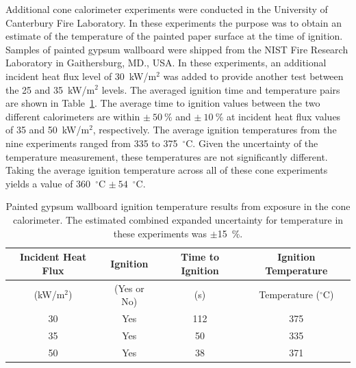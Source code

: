 \documentclass[twoside]{uocthesis}
\begin{document}
{Additional cone calorimeter experiments were conducted in the University of Canterbury Fire Laboratory.  In these experiments the purpose was to obtain an estimate of the temperature of the painted paper surface at the time of ignition.   Samples of painted gypsum wallboard were shipped from the NIST Fire Research Laboratory in Gaithersburg, MD., USA.  In these experiments, an additional incident heat flux level of 30~kW/m$^2$ was added to provide another test between the 25 and 35~kW/m$^2$ levels.  The averaged ignition time and temperature pairs are shown in Table~\ref{tab:Gypsum_wallboard_igntemp}.  The average time to ignition values between the two different calorimeters are within $\pm~50~\%$ and $\pm~10~\%$ at incident heat flux values of 35 and 50~kW/m$^2$, respectively.  The average ignition temperatures from the nine experiments ranged from 335 to 375~$^{\circ}$C.  Given the uncertainty of the temperature measurement, these temperatures are not significantly different.  Taking the average ignition temperature across all of these cone experiments yields a value of 360~$^{\circ}$C $\pm~54$~$^{\circ}$C.  
          
\begin{table}
	\centering
	\begin{tabular}{|c|c|c|c|}
		\hline Incident Heat Flux & Ignition & Time to Ignition & Ignition Temperature \\
		\hline (kW/m$^2$) & (Yes or No) & (s)  & Temperature ($^{\circ}$C)   \\ 
		\hline 30 	& Yes 	& 112	& 375 	 \\
		\hline 35	& Yes 	& 50 	& 335 	 \\
		\hline 50	& Yes 	& 38 	& 371 	 \\
		\hline
	\end{tabular}
	\caption[Painted gypsum wallboard ignition temperature results]{Painted gypsum wallboard ignition temperature results from exposure in the cone calorimeter.  The estimated combined expanded uncertainty for temperature in these experiments was $\pm$15~\%.}
	\label{tab:Gypsum_wallboard_igntemp}
\end{table}

}
\end{document}
